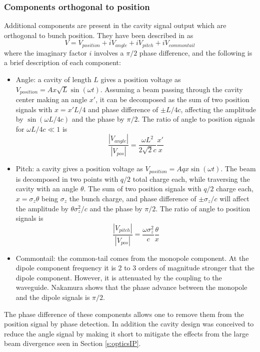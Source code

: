 \subsubsection{Components orthogonal to position}
Additional components are present in the cavity signal output which are orthogonal to bunch position. They have been described in \cite{Nakathese} as
\begin{equation}
 V=V_{position}+iV_{angle}+iV_{pitch}+iV_{commontail}
\end{equation}
where the imaginary factor $i$ involves a $\pi/2$ phase difference, and the following is a brief description of each component:\par
\begin{itemize}
 \item Angle: a cavity of length $L$ gives a position voltage as $V_{position}=Ax\sqrt{L}\sin(\omega t)$. Assuming a beam passing through the cavity center making an angle $x'$, it can be decomposed as the sum of two position signals with $x=x'L/4$ and phase difference of $\pm L/4c$, affecting the amplitude by $\sin(\omega L/4c)$ and the phase by $\pi/2$. The ratio of angle to position signals for $\omega L/4c\ll 1$ is
 \begin{equation}
  \frac{|V_{angle}|}{|V_{pos}|}=\frac{\omega L^2}{2\sqrt{2}c}\frac{x'}{x}
 \end{equation}
\item Pitch: a cavity gives a position voltage as $V_{position}=Aqx\sin(\omega t)$. The beam is decomposed in two points with $q/2$ total charge each, while traversing the cavity with an angle $\theta$. The sum of two position signals with $q/2$ charge each,  $x=\sigma_z\theta$ being $\sigma_z$ the bunch charge, and phase difference of $\pm\sigma_z/c$ will affect the amplitude by $\theta\sigma_z^2/c$ and the phase by $\pi/2$. The ratio of angle to position signals is
\begin{equation}
  \frac{|V_{pitch}|}{|V_{pos}|}=\frac{\omega \sigma_z^2}{c}\frac{\theta}{x}
\end{equation}
\item Commontail: the common-tail \cite{Shintake:1998fga} comes from the monopole component. At the dipole component frequency it is 2 to 3 orders of magnitude stronger that the dipole component. However, it is attenuated by the coupling to the waveguide. Nakamura \cite{Nakathese} shows that the phase advance between the monopole and the dipole signals is $\pi/2$.\par
\end{itemize}
The phase difference of these components allows one to remove them from the position signal by phase detection. In addition the cavity design was conceived to reduce the angle signal by making it short to mitigate the effects from the large beam divergence seen in Section \ref{s:opticsIP}.\par

